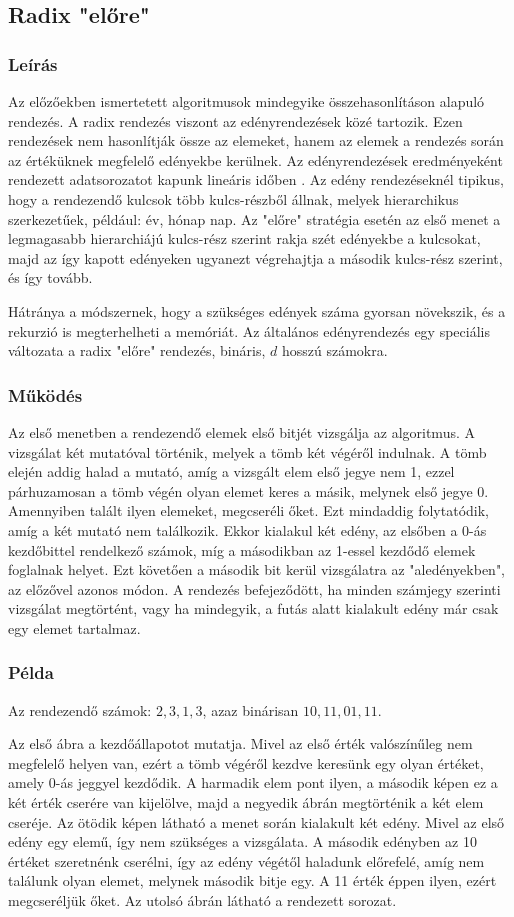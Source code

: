 \documentclass{elteikthesis}
\newcommand{\hiddensubsubsection}[1]{
	\stepcounter{subsubsection}
	\subsubsection*{{#1}}	
}
\begin{document}
\subsection{Radix "előre"}
\hiddensubsubsection{Leírás}
Az előzőekben ismertetett algoritmusok mindegyike összehasonlításon alapuló rendezés. A radix rendezés viszont az edényrendezések közé tartozik. Ezen rendezések nem hasonlítják össze az elemeket, hanem az elemek a rendezés során az értéküknek megfelelő edényekbe kerülnek. Az edényrendezések eredményeként rendezett adatsorozatot kapunk lineáris időben \cite{Ronyai}. 
Az edény rendezéseknél tipikus, hogy a rendezendő kulcsok több kulcs-részből állnak, melyek hierarchikus szerkezetűek, például: év, hónap nap. Az "előre" stratégia esetén az első menet a legmagasabb hierarchiájú kulcs-rész szerint rakja szét edényekbe a kulcsokat, majd az így kapott edényeken ugyanezt végrehajtja a második kulcs-rész szerint, és így tovább.\par
Hátránya a módszernek, hogy a szükséges edények száma gyorsan növekszik, és a rekurzió is megterhelheti a memóriát.
Az általános edényrendezés egy speciális változata a radix "előre" rendezés, bináris, $d$ hosszú számokra.\par
\hiddensubsubsection{Működés}
Az első menetben a rendezendő elemek első bitjét vizsgálja az algoritmus. A vizsgálat két mutatóval történik, melyek a tömb két végéről indulnak. A tömb elején addig halad a mutató, amíg a vizsgált elem első jegye nem 1, ezzel párhuzamosan a tömb végén olyan elemet keres a másik, melynek első jegye 0. Amennyiben talált ilyen elemeket, megcseréli őket. Ezt mindaddig folytatódik, amíg a két mutató nem találkozik. Ekkor kialakul két edény, az elsőben a 0-ás kezdőbittel rendelkező számok, míg a másodikban az 1-essel kezdődő elemek foglalnak helyet. Ezt követően a második bit kerül vizsgálatra az "aledényekben", az előzővel azonos módon. A rendezés befejeződött, ha minden számjegy szerinti vizsgálat megtörtént, vagy ha mindegyik, a futás alatt kialakult edény már csak egy elemet tartalmaz.
 \hiddensubsubsection{Példa}
 Az rendezendő számok: $2, 3, 1, 3$, azaz binárisan $10, 11, 01, 11$.\par
 Az első ábra a kezdőállapotot mutatja. Mivel az első érték valószínűleg nem megfelelő helyen van, ezért a tömb végéről kezdve keresünk egy olyan értéket, amely 0-ás jeggyel kezdődik. A harmadik elem pont ilyen, a második képen ez a két érték cserére van kijelölve, majd a negyedik ábrán megtörténik a két elem cseréje. Az ötödik képen látható a menet során kialakult két edény. Mivel az első edény egy elemű, így nem szükséges a vizsgálata. A második edényben az 10 értéket szeretnénk cserélni, így az edény végétől haladunk előrefelé, amíg nem találunk olyan elemet, melynek második bitje egy. A 11 érték éppen ilyen, ezért megcseréljük őket. Az utolsó ábrán látható a rendezett sorozat.\par
\end{document}
